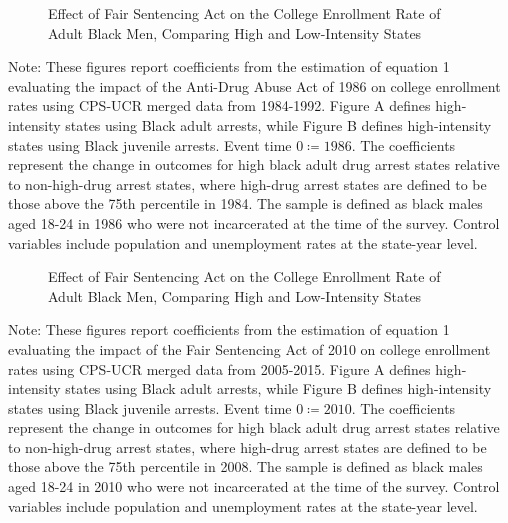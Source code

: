 \clearpage 

\begin{figure}[h]
  \centering
  \caption{Effect of Fair Sentencing Act on the College Enrollment Rate of Adult Black Men, Comparing High and Low-Intensity States}%
  \qquad
  \label{fig:rs_es_1986}%
\end{figure}

\begin{footnotesize}
  \noindent Note: These figures report coefficients from the estimation of equation 1 evaluating the impact of the Anti-Drug Abuse Act of 1986 on college enrollment rates using CPS-UCR merged data from 1984-1992. Figure A defines high-intensity states using Black adult arrests, while Figure B defines high-intensity states using Black juvenile arrests. Event time $0 \coloneqq 1986$. The coefficients represent the change in outcomes for high black adult drug arrest states relative to non-high-drug arrest states, where high-drug arrest states are defined to be those above the 75th percentile in 1984. The sample is defined as black males aged 18-24 in 1986 who were not incarcerated at the time of the survey. Control variables include population and unemployment rates at the state-year level. 
\end{footnotesize}

\clearpage

\begin{figure}[h]
  \centering
  \caption{Effect of Fair Sentencing Act on the College Enrollment Rate of Adult Black Men, Comparing High and Low-Intensity States}%
  \qquad
  \label{fig:rf_jb_es_2010}%
\end{figure}

\begin{footnotesize}
  \noindent Note: These figures report coefficients from the estimation of equation 1 evaluating the impact of the Fair Sentencing Act of 2010 on college enrollment rates using CPS-UCR merged data from 2005-2015. Figure A defines high-intensity states using Black adult arrests, while Figure B defines high-intensity states using Black juvenile arrests. Event time $0 \coloneqq 2010$. The coefficients represent the change in outcomes for high black adult drug arrest states relative to non-high-drug arrest states, where high-drug arrest states are defined to be those above the 75th percentile in 2008. The sample is defined as black males aged 18-24 in 2010 who were not incarcerated at the time of the survey. Control variables include population and unemployment rates at the state-year level. 
\end{footnotesize}

\clearpage
